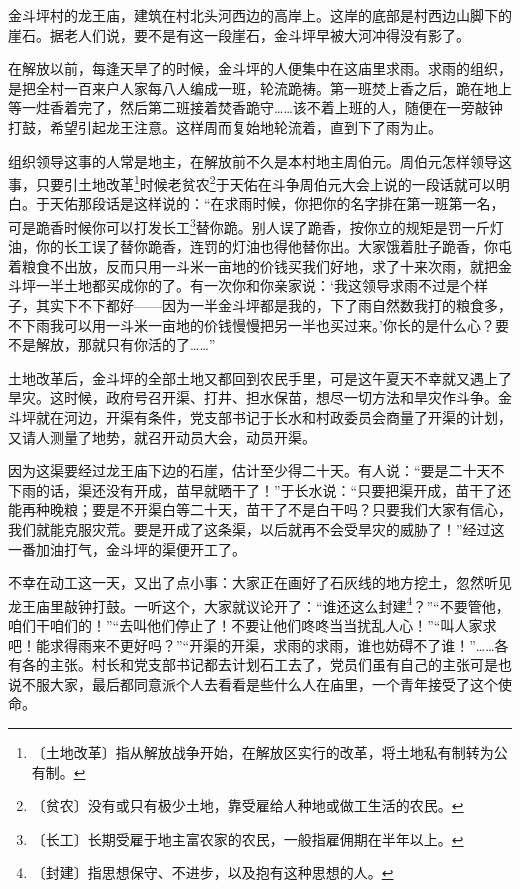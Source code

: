 \documentclass[12pt,UTF-8,openany]{ctexbook}
\begin{document}
\begin{large}
    
    金斗坪村的龙王庙，建筑在村北头河西边的高岸上。这岸的底部是村西边山脚下的崖石。据老人们说，要不是有这一段崖石，金斗坪早被大河冲得没有影了。
    
    在解放以前，每逢天旱了的时候，金斗坪的人便集中在这庙里求雨。求雨的组织，是把全村一百来户人家每八人编成一班，轮流跪祷。第一班焚上香之后，跪在地上等一炷香着完了，然后第二班接着焚香跪守……该不着上班的人，随便在一旁敲钟打鼓，希望引起龙王注意。这样周而复始地轮流着，直到下了雨为止。
    
    组织领导这事的人常是地主，在解放前不久是本村地主周伯元。周伯元怎样领导这事，只要引土地改革\footnote{〔土地改革〕指从解放战争开始，在解放区实行的改革，将土地私有制转为公有制。}时候老贫农\footnote{〔贫农〕没有或只有极少土地，靠受雇给人种地或做工生活的农民。}于天佑在斗争周伯元大会上说的一段话就可以明白。于天佑那段话是这样说的：“在求雨时候，你把你的名字排在第一班第一名，可是跪香时候你可以打发长工\footnote{〔长工〕长期受雇于地主富农家的农民，一般指雇佣期在半年以上。}替你跪。别人误了跪香，按你立的规矩是罚一斤灯油，你的长工误了替你跪香，连罚的灯油也得他替你出。大家饿着肚子跪香，你屯着粮食不出放，反而只用一斗米一亩地的价钱买我们好地，求了十来次雨，就把金斗坪一半土地都买成你的了。有一次你和你亲家说：‘我这领导求雨不过是个样子，其实下不下都好——因为一半金斗坪都是我的，下了雨自然数我打的粮食多，不下雨我可以用一斗米一亩地的价钱慢慢把另一半也买过来。’你长的是什么心？要不是解放，那就只有你活的了……”
    
    土地改革后，金斗坪的全部土地又都回到农民手里，可是这午夏天不幸就又遇上了旱灾。这时候，政府号召开渠、打井、担水保苗，想尽一切方法和旱灾作斗争。金斗坪就在河边，开渠有条件，党支部书记于长水和村政委员会商量了开渠的计划，又请人测量了地势，就召开动员大会，动员开渠。
    
    因为这渠要经过龙王庙下边的石崖，估计至少得二十天。有人说：“要是二十天不下雨的话，渠还没有开成，苗早就晒干了！”于长水说：“只要把渠开成，苗干了还能再种晚粮；要是不开渠白等二十天，苗干了不是白干吗？只要我们大家有信心，我们就能克服灾荒。要是开成了这条渠，以后就再不会受旱灾的威胁了！”经过这一番加油打气，金斗坪的渠便开工了。
    
    不幸在动工这一天，又出了点小事：大家正在画好了石灰线的地方挖土，忽然听见龙王庙里敲钟打鼓。一听这个，大家就议论开了：“谁还这么封建\footnote{〔封建〕指思想保守、不进步，以及抱有这种思想的人。}？”“不要管他，咱们干咱们的！”“去叫他们停止了！不要让他们咚咚当当扰乱人心！”“叫人家求吧！能求得雨来不更好吗？”“开渠的开渠，求雨的求雨，谁也妨碍不了谁！”……各有各的主张。村长和党支部书记都去计划石工去了，党员们虽有自己的主张可是也说不服大家，最后都同意派个人去看看是些什么人在庙里，一个青年接受了这个使命。
    

\end{large}
\end{document}
